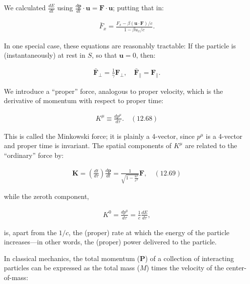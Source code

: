 \documentclass[12pt]{book}
\newcommand{\bm}[1]{\boldsymbol{#1}}
\begin{document}
        We calculated \(\frac{dE}{dt}\) using \(\frac{d\bm{p}}{dt} \cdot \bm{u} = \bm{F} \cdot \bm{u}\); putting that in:
        
        \begin{align}
        \bar{F}_x = \frac{F_x - \beta (\bm{u} \cdot \bm{F})/c}{1 - \beta u_x/c}.
        \end{align}
        
        In one special case, these equations are reasonably tractable: If the particle is (instantaneously) at rest in \(S\), so that \(\bm{u} = 0\), then:
        
        \begin{align}
        \bar{\bm{F}}_\perp = \frac{1}{\gamma} \bm{F}_\perp, \quad \bar{\bm{F}}_\parallel = \bm{F}_\parallel.
        \end{align}
        
        We introduce a “proper” force, analogous to proper velocity, which is the derivative of momentum with respect to proper time:
        
        \begin{align}
        K^\mu \equiv \frac{dp^\mu}{d\tau}. \quad (12.68)
        \end{align}
        
        This is called the Minkowski force; it is plainly a 4-vector, since \(p^\mu\) is a 4-vector and proper time is invariant. The spatial components of \(K^\mu\) are related to the “ordinary” force by:
        
        \begin{align}
        \bm{K} = \left(\frac{dt}{d\tau}\right) \frac{d\bm{p}}{dt} = \frac{1}{\sqrt{1 - \frac{u^2}{c^2}}} \bm{F}, \quad (12.69)
        \end{align}
        
        while the zeroth component,
        
        \begin{align}
        K^0 = \frac{dp^0}{d\tau} = \frac{1}{c} \frac{dE}{d\tau},
        \end{align}
        
        is, apart from the \(1/c\), the (proper) rate at which the energy of the particle increases—in other words, the (proper) power delivered to the particle.

        In classical mechanics, the total momentum (\(\bm{P}\)) of a collection of interacting particles can be expressed as the total mass (\(M\)) times the velocity of the center-of-mass:
        
\end{document}

